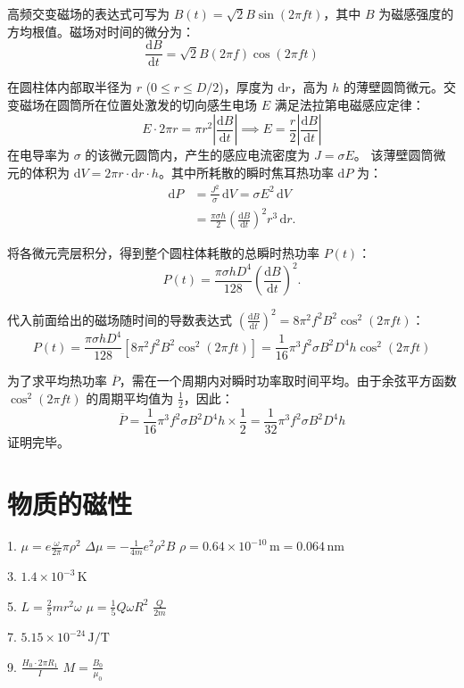 \begin{solution}
高频交变磁场的表达式可写为 $B(t) = \sqrt{2} B \sin(2\pi f t)$，其中 $B$ 为磁感强度的方均根值。磁场对时间的微分为：
$$ \frac{\mathrm{d}B}{\mathrm{d}t} = \sqrt{2} B (2\pi f) \cos(2\pi f t) $$

在圆柱体内部取半径为 $r$ ($0 \le r \le D/2$)，厚度为 $\mathrm{d}r$，高为 $h$ 的薄壁圆筒微元。交变磁场在圆筒所在位置处激发的切向感生电场 $E$ 满足法拉第电磁感应定律：
$$ E \cdot 2\pi r = \pi r^2 \left| \frac{\mathrm{d}B}{\mathrm{d}t} \right| \implies E = \frac{r}{2} \left| \frac{\mathrm{d}B}{\mathrm{d}t} \right| $$
在电导率为 $\sigma$ 的该微元圆筒内，产生的感应电流密度为 $J = \sigma E$。
该薄壁圆筒微元的体积为 $\mathrm{d}V = 2\pi r \cdot \mathrm{d}r \cdot h$。其中所耗散的瞬时焦耳热功率 $\mathrm{d}P$ 为：
\[
\begin{aligned}
\mathrm{d}P&=\frac{J^2}{\sigma}\,\mathrm{d}V
 =\sigma E^2\,\mathrm{d}V\\
 &=\frac{\pi\sigma h}{2}
 \left(\frac{\mathrm{d}B}{\mathrm{d}t}\right)^2r^3\,\mathrm{d}r.
\end{aligned}
\]

将各微元壳层积分，得到整个圆柱体耗散的总瞬时热功率 $P(t)$：
\[
P(t)=\frac{\pi\sigma hD^4}{128}
\left(\frac{\mathrm{d}B}{\mathrm{d}t}\right)^2.
\]

代入前面给出的磁场随时间的导数表达式 $\left( \frac{\mathrm{d}B}{\mathrm{d}t} \right)^2 = 8 \pi^2 f^2 B^2 \cos^2(2\pi f t)$：
$$ P(t) = \frac{\pi \sigma h D^4}{128} \left[ 8 \pi^2 f^2 B^2 \cos^2(2\pi f t) \right] = \frac{1}{16} \pi^3 f^2 \sigma B^2 D^4 h \cos^2(2\pi f t) $$

为了求平均热功率 $\overline{P}$，需在一个周期内对瞬时功率取时间平均。由于余弦平方函数 $\cos^2(2\pi f t)$ 的周期平均值为 $\frac{1}{2}$，因此：
$$ \overline{P} = \frac{1}{16} \pi^3 f^2 \sigma B^2 D^4 h \times \frac{1}{2} = \frac{1}{32} \pi^3 f^2 \sigma B^2 D^4 h $$
证明完毕。
\end{solution}



\chapter{物质的磁性}

\begin{oddanswers}
1. $\mu = e \frac{\omega}{2\pi} \pi \rho^2$
$\Delta \mu = -\frac{1}{4m} e^2 \rho^2 B$
$\rho = 0.64 \times 10^{-10} \,\mathrm{m} = 0.064 \,\mathrm{nm}$

3. $1.4 \times 10^{-3}\,\mathrm{K}$

5. $L = \frac{2}{5} mr^2 \omega$
$\mu = \frac{1}{5} Q\omega R^2$
$\frac{Q}{2m}$

7. $5.15 \times 10^{-24}\,\mathrm{J/T}$

9. $\frac{H_0 \cdot 2\pi R_1}{I}$
$M = \frac{B_0}{\mu_0}$
\end{oddanswers}

